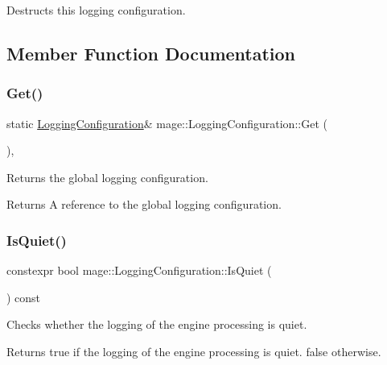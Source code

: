 Destructs this logging configuration. 

\subsection{Member Function Documentation}
\hypertarget{classmage_1_1_logging_configuration_a2362fda9a66570dbb7cd77f9f64af9fe}{}\label{classmage_1_1_logging_configuration_a2362fda9a66570dbb7cd77f9f64af9fe} 
\subsubsection{\texorpdfstring{Get()}{Get()}}
{\footnotesize\ttfamily static \hyperlink{classmage_1_1_logging_configuration}{Logging\+Configuration}\& mage\+::\+Logging\+Configuration\+::\+Get (\begin{DoxyParamCaption}{ }\end{DoxyParamCaption})\hspace{0.3cm}{\ttfamily [static]}, {\ttfamily [noexcept]}}

Returns the global logging configuration.

\begin{DoxyReturn}{Returns}
A reference to the global logging configuration. 
\end{DoxyReturn}
\hypertarget{classmage_1_1_logging_configuration_a1096a1ef5f9237fb76fc5937ac1a1210}{}\label{classmage_1_1_logging_configuration_a1096a1ef5f9237fb76fc5937ac1a1210} 
\subsubsection{\texorpdfstring{Is\+Quiet()}{IsQuiet()}}
{\footnotesize\ttfamily constexpr bool mage\+::\+Logging\+Configuration\+::\+Is\+Quiet (\begin{DoxyParamCaption}{ }\end{DoxyParamCaption}) const\hspace{0.3cm}{\ttfamily [noexcept]}}

Checks whether the logging of the engine processing is quiet.

\begin{DoxyReturn}{Returns}
{\ttfamily true} if the logging of the engine processing is quiet. {\ttfamily false} otherwise. 
\end{DoxyReturn}
\hypertarget{classmage_1_1_logging_configuration_abd81834c6938be1b32a7bd6eb08d5242}{}\label{classmage_1_1_logging_configuration_abd81834c6938be1b32a7bd6eb08d5242} 
